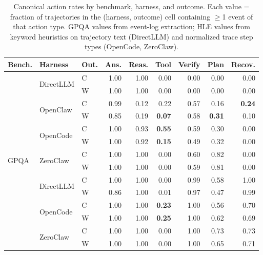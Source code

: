 \begin{table}[t]
\centering
\small
\caption{%
  Canonical action rates by benchmark, harness, and outcome.
  Each value = fraction of trajectories in the (harness, outcome) cell
  containing $\ge$1 event of that action type.
  GPQA values from event-log extraction; HLE values from keyword heuristics
  on trajectory text (DirectLLM) and normalized trace step types (OpenCode,
  ZeroClaw).
}
\label{tab:cross-action-rates}
\setlength{\tabcolsep}{2.5pt}
\begin{tabular}{lllrrrrrr}
\toprule
Bench. & Harness & Out. & Ans. & Reas. & Tool & Verify & Plan & Recov. \\
\midrule
\multirow{14}{*}{GPQA}
& \multirow{2}{*}{DirectLLM}
  & C & 1.00 & 1.00 & 0.00 & 0.00 & 0.00 & 0.00 \\
& & W & 1.00 & 1.00 & 0.00 & 0.00 & 0.00 & 0.00 \\
\cmidrule{2-8}
& \multirow{2}{*}{OpenClaw}
  & C & 0.99 & 0.12 & 0.22 & 0.57 & 0.16 & \textbf{0.24} \\
& & W & 0.85 & 0.19 & \textbf{0.07} & 0.58 & \textbf{0.31} & 0.10 \\
\cmidrule{2-8}
& \multirow{2}{*}{OpenCode}
  & C & 1.00 & 0.93 & \textbf{0.55} & 0.59 & 0.30 & 0.00 \\
& & W & 1.00 & 0.92 & \textbf{0.15} & 0.49 & 0.32 & 0.00 \\
\cmidrule{2-8}
& \multirow{2}{*}{ZeroClaw}
  & C & 1.00 & 1.00 & 0.00 & 0.60 & 0.82 & 0.00 \\
& & W & 1.00 & 1.00 & 0.00 & 0.59 & 0.81 & 0.00 \\
\midrule
\multirow{12}{*}{HLE}
& \multirow{2}{*}{DirectLLM}
  & C & 1.00 & 1.00 & 0.00 & 0.99 & 0.58 & 1.00 \\
& & W & 0.86 & 1.00 & 0.01 & 0.97 & 0.47 & 0.99 \\
\cmidrule{2-8}
& \multirow{2}{*}{OpenCode}
  & C & 1.00 & 1.00 & \textbf{0.23} & 1.00 & 0.56 & 0.70 \\
& & W & 1.00 & 1.00 & \textbf{0.25} & 1.00 & 0.62 & 0.69 \\
\cmidrule{2-8}
& \multirow{2}{*}{ZeroClaw}
  & C & 1.00 & 1.00 & 0.00 & 1.00 & 0.73 & 0.73 \\
& & W & 1.00 & 1.00 & 0.00 & 1.00 & 0.65 & 0.71 \\
\bottomrule
\end{tabular}
\end{table}


